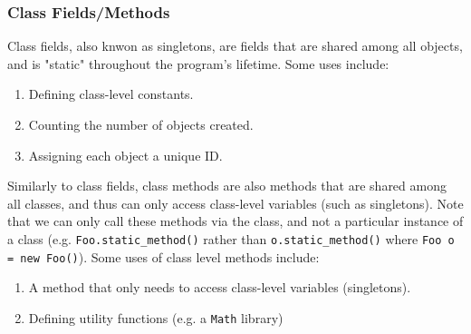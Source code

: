 \documentclass{article}
\begin{document}
\subsubsection{Class Fields/Methods}
Class fields, also knwon as singletons, are fields that are shared
among all objects, and is "static" throughout the program's
lifetime. Some uses include:
\begin{enumerate}[label=(\roman*)]
\item Defining class-level constants.
\item Counting the number of objects created.
\item Assigning each object a unique ID.
\end{enumerate}
Similarly to class fields, class methods are also methods that are
shared among all classes, and thus can only access class-level
variables (such as singletons). Note that we can only call these
methods via the class, and not a particular instance of a class
(e.g. \texttt{Foo.static\_method()} rather than
\texttt{o.static\_method()} where \texttt{Foo o = new Foo()}). Some
uses of class level methods include:
\begin{enumerate}[label=(\roman*)]
\item A method that only needs to access class-level variables
  (singletons).
\item Defining utility functions (e.g. a \texttt{Math} library)
\end{enumerate}
\end{document}
